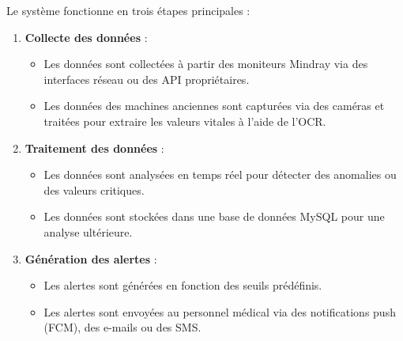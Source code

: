 Le système fonctionne en trois étapes principales :

\begin{enumerate}
    \item \textbf{Collecte des données} :
    \begin{itemize}
        \item Les données sont collectées à partir des moniteurs Mindray via des interfaces réseau ou des API propriétaires.
        \item Les données des machines anciennes sont capturées via des caméras et traitées pour extraire les valeurs vitales à l'aide de l'OCR.
    \end{itemize}
    
    \item \textbf{Traitement des données} :
    \begin{itemize}
        \item Les données sont analysées en temps réel pour détecter des anomalies ou des valeurs critiques.
        \item Les données sont stockées dans une base de données MySQL pour une analyse ultérieure.
    \end{itemize}
    
    \item \textbf{Génération des alertes} :
    \begin{itemize}
        \item Les alertes sont générées en fonction des seuils prédéfinis.
        \item Les alertes sont envoyées au personnel médical via des notifications push (FCM), des e-mails ou des SMS.
    \end{itemize}
\end{enumerate}